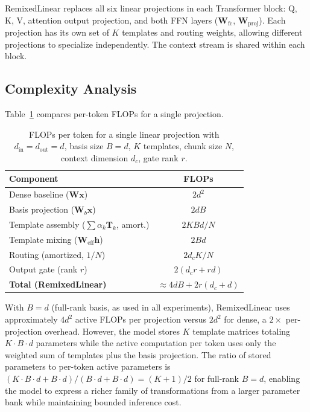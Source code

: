 \documentclass[11pt]{article}
\begin{document}
RemixedLinear replaces all six linear projections in each Transformer block: Q, K, V, attention output projection, and both FFN layers ($\mathbf{W}_\text{fc}$, $\mathbf{W}_\text{proj}$). Each projection has its own set of $K$ templates and routing weights, allowing different projections to specialize independently. The context stream is shared within each block.

\subsection{Complexity Analysis}

Table~\ref{tab:flops} compares per-token FLOPs for a single projection.

\begin{table}[t]
\centering
\small
\caption{FLOPs per token for a single linear projection with $d_\text{in} = d_\text{out} = d$, basis size $B = d$, $K$ templates, chunk size $N$, context dimension $d_c$, gate rank $r$.}
\label{tab:flops}
\begin{tabular}{@{}lc@{}}
\toprule
\textbf{Component} & \textbf{FLOPs} \\
\midrule
Dense baseline ($\mathbf{W}\mathbf{x}$) & $2d^2$ \\
\midrule
Basis projection ($\mathbf{W}_b \mathbf{x}$) & $2dB$ \\
Template assembly ($\sum \alpha_k \mathbf{T}_k$, amort.) & $2KBd/N$ \\
Template mixing ($\mathbf{W}_\text{eff} \mathbf{h}$) & $2Bd$ \\
Routing (amortized, $1/N$) & $2d_c K/N$ \\
Output gate (rank $r$) & $2(d_c r + rd)$ \\
\midrule
\textbf{Total (RemixedLinear)} & $\approx 4dB + 2r(d_c{+}d)$ \\
\bottomrule
\end{tabular}
\end{table}

With $B = d$ (full-rank basis, as used in all experiments), RemixedLinear uses approximately $4d^2$ active FLOPs per projection versus $2d^2$ for dense, a $2\times$ per-projection overhead. However, the model stores $K$ template matrices totaling $K \cdot B \cdot d$ parameters while the active computation per token uses only the weighted sum of templates plus the basis projection. The ratio of stored parameters to per-token active parameters is $(K \cdot B \cdot d + B \cdot d) / (B \cdot d + B \cdot d) = (K{+}1)/2$ for full-rank $B{=}d$, enabling the model to express a richer family of transformations from a larger parameter bank while maintaining bounded inference cost.
\end{document}
